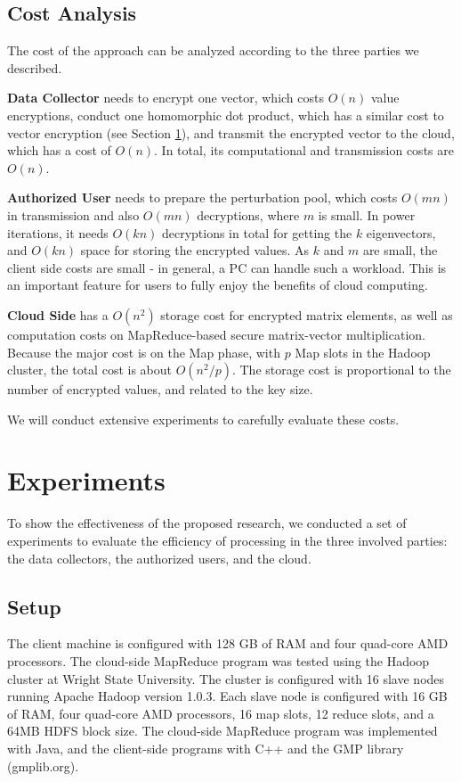 \documentclass[10pt, conference, compsocconf]{IEEEtran}
\begin{document}
\subsection{Cost Analysis}
The cost of the approach can be analyzed according to the three parties we described. 

\textbf{Data Collector} needs to encrypt one vector, which costs $O(n)$ value encryptions, conduct one homomorphic dot product, which has a similar cost to vector encryption (see Section \ref{sec:exp}), and transmit the encrypted vector to the cloud, which has a cost of $O(n)$. In total, its computational and transmission costs are $O(n)$.

\textbf{Authorized User} needs to prepare the perturbation pool, which costs $O(mn)$ in transmission and also $O(mn)$ decryptions, where $m$ is small. In power iterations, it needs $O(kn)$ decryptions in total for getting the $k$ eigenvectors, and $O(kn)$ space for storing the encrypted values. As $k$ and $m$ are small, the client side costs are small - in general, a PC can handle such a workload. This is an important feature for users to fully enjoy the benefits of cloud computing.
 


\textbf{Cloud Side} has a $O(n^2)$ storage cost for encrypted matrix elements, as well as computation costs on MapReduce-based secure matrix-vector multiplication. Because the major cost is on the Map phase, with $p$ Map slots in the Hadoop cluster, the total cost is about $O(n^2/p)$. The storage cost is proportional to the number of encrypted values, and related to the key size. 

We will conduct extensive experiments to carefully evaluate these costs.  


\section{Experiments}\label{sec:exp}


To show the effectiveness of the proposed research, we conducted a set of experiments to evaluate the efficiency of processing in the three involved parties: the data collectors, the authorized users, and the cloud.   


\subsection{Setup}
The client machine is configured with 128 GB of RAM and four quad-core AMD processors. The cloud-side MapReduce program was tested using the Hadoop cluster at Wright State University. The cluster is configured with 16 slave nodes running Apache Hadoop version 1.0.3. Each slave node is configured with 16 GB of RAM, four quad-core AMD processors, 16 map slots, 12 reduce slots, and a 64MB HDFS block size.  The cloud-side MapReduce program was implemented with Java, and the client-side programs with C++ and the GMP library (gmplib.org). 
\end{document}
